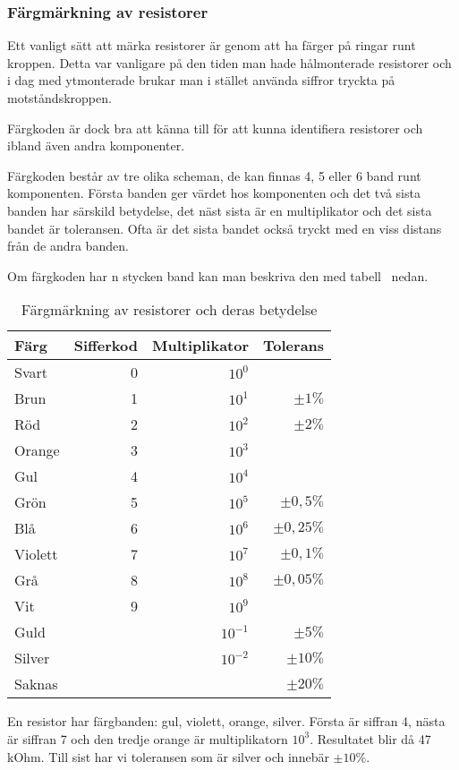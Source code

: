\subsubsection{Färgmärkning av resistorer}

Ett vanligt sätt att märka resistorer är genom att ha färger på ringar runt
kroppen.
Detta var vanligare på den tiden man hade hålmonterade resistorer och i dag med
ytmonterade brukar man i stället använda siffror tryckta på motståndskroppen.

Färgkoden är dock bra att känna till för att kunna identifiera resistorer
och ibland även andra komponenter.

Färgkoden består av tre olika scheman, de kan finnas 4, 5 eller 6 band runt
komponenten.
Första banden ger värdet hos komponenten och det två sista banden har särskild
betydelse, det näst sista är en multiplikator och det sista bandet är
toleransen.
Ofta är det sista bandet också tryckt med en viss distans från de andra banden.

Om färgkoden har n stycken band kan man beskriva den med
tabell~ nedan.

\begin{table}[H]
\begin{tabular}{lrrr}
	\textbf{Färg}    & \textbf{Sifferkod} &     \textbf{Multiplikator} 
	&     \textbf{Tolerans} \\ \hline \hline
	Svart   &         0 &    $10^0$ &              \\ \hline
	Brun    &         1 &    $10^1$ &    $\pm 1\%$ \\ \hline
	Röd     &         2 &    $10^2$ &    $\pm 2\%$ \\ \hline
	Orange  &         3 &    $10^3$ &              \\ \hline
	Gul     &         4 &    $10^4$ &              \\ \hline
	Grön    &         5 &    $10^5$ &  $\pm 0,5\%$ \\ \hline
	Blå     &         6 &    $10^6$ & $\pm 0,25\%$ \\ \hline
	Violett &         7 &    $10^7$ &  $\pm 0,1\%$ \\ \hline
	Grå     &         8 &    $10^8$ & $\pm 0,05\%$ \\ \hline
	Vit     &         9 &    $10^9$ &              \\ \hline
	Guld    &           & $10^{-1}$ &    $\pm 5\%$ \\ \hline
	Silver  &           & $10^{-2}$ &   $\pm 10\%$ \\ \hline
	Saknas  &           &           &   $\pm 20\%$ \\ \hline
\end{tabular}
\caption{Färgmärkning av resistorer och deras betydelse}
\label{tab:rcolors}
\end{table}

\begin{exempelbox}
En resistor har färgbanden: gul, violett, orange, silver.
\tcblower
Första är siffran 4, nästa är siffran 7 och den tredje orange är
multiplikatorn $10^3$.
Resultatet blir då 47\,kOhm.
Till sist har vi toleransen som är silver och innebär $\pm 10\%$.
\end{exempelbox}

